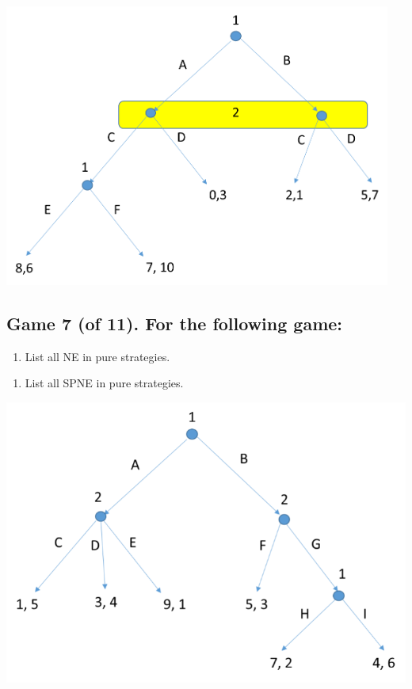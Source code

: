\documentclass[11pt]{article}
\begin{document}
\includegraphics{Images/FinalGameTree1.png}


\pagebreak

\subsection*{Game 7 (of 11). For the following game:
}

\begin{enumerate}[label=\alph*), start=1]
\item  List all NE in pure strategies. \hfill \raisebox{-1ex}{\rule{4.2cm}{1pt}}

\end{enumerate}
\begin{enumerate}[label=\alph*), start=2]
\item  List all SPNE in pure strategies. \hfill \raisebox{-1ex}{\rule{4.2cm}{1pt}}

\end{enumerate}


\includegraphics{Images/Picture7.png}
\end{document}
